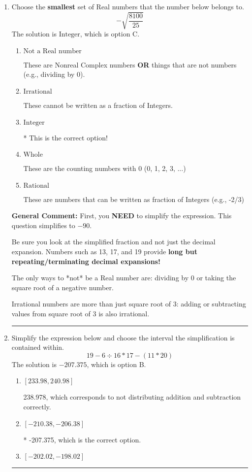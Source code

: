 \documentclass{extbook}[14pt]
\newcommand{\litem}[1]{\item #1

\rule{\textwidth}{0.4pt}}
\begin{document}
\begin{enumerate}\litem{
Choose the \textbf{smallest} set of Real numbers that the number below belongs to.
\[ -\sqrt{\frac{8100}{25}} \]The solution is \( \text{Integer} \), which is option C.\begin{enumerate}[label=\Alph*.]
\item \( \text{Not a Real number} \)

These are Nonreal Complex numbers \textbf{OR} things that are not numbers (e.g., dividing by 0).
\item \( \text{Irrational} \)

These cannot be written as a fraction of Integers.
\item \( \text{Integer} \)

* This is the correct option!
\item \( \text{Whole} \)

These are the counting numbers with 0 (0, 1, 2, 3, ...)
\item \( \text{Rational} \)

These are numbers that can be written as fraction of Integers (e.g., -2/3)
\end{enumerate}

\textbf{General Comment:} First, you \textbf{NEED} to simplify the expression. This question simplifies to $-90$. 
 
 Be sure you look at the simplified fraction and not just the decimal expansion. Numbers such as 13, 17, and 19 provide \textbf{long but repeating/terminating decimal expansions!} 
 
 The only ways to *not* be a Real number are: dividing by 0 or taking the square root of a negative number. 
 
 Irrational numbers are more than just square root of 3: adding or subtracting values from square root of 3 is also irrational.
}
\litem{
Simplify the expression below and choose the interval the simplification is contained within.
\[ 19 - 6 \div 16 * 17 - (11 * 20) \]The solution is \( -207.375 \), which is option B.\begin{enumerate}[label=\Alph*.]
\item \( [233.98, 240.98] \)

 238.978, which corresponds to not distributing addition and subtraction correctly.
\item \( [-210.38, -206.38] \)

* -207.375, which is the correct option.
\item \( [-202.02, -198.02] \)


\end{enumerate}}
\end{enumerate}
\end{document}
